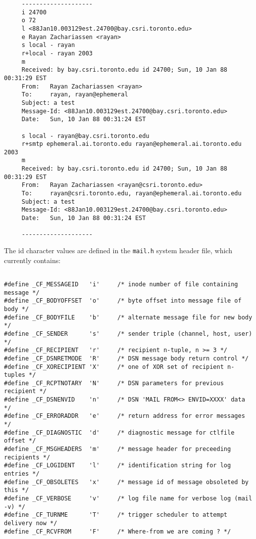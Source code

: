 \begin{tscreen}
\begin{verbatim}
     --------------------
     i 24700
     o 72
     l <88Jan10.003129est.24700@bay.csri.toronto.edu>
     e Rayan Zachariassen <rayan>
     s local - rayan
     r+local - rayan 2003
     m
     Received: by bay.csri.toronto.edu id 24700; Sun, 10 Jan 88 00:31:29 EST
     From:   Rayan Zachariassen <rayan>
     To:     rayan, rayan@ephemeral
     Subject: a test
     Message-Id: <88Jan10.003129est.24700@bay.csri.toronto.edu>
     Date:   Sun, 10 Jan 88 00:31:24 EST
     
     s local - rayan@bay.csri.toronto.edu
     r+smtp ephemeral.ai.toronto.edu rayan@ephemeral.ai.toronto.edu 2003
     m
     Received: by bay.csri.toronto.edu id 24700; Sun, 10 Jan 88 00:31:29 EST
     From:   Rayan Zachariassen <rayan@csri.toronto.edu>
     To:     rayan@csri.toronto.edu, rayan@ephemeral.ai.toronto.edu
     Subject: a test
     Message-Id: <88Jan10.003129est.24700@bay.csri.toronto.edu>
     Date:   Sun, 10 Jan 88 00:31:24 EST
     
     --------------------
\end{verbatim}
\end{tscreen}


The id character values are defined in the {\tt mail.h} system header file,
which currently contains:

\begin{tscreen}
\begin{verbatim}
     
#define _CF_MESSAGEID   'i'     /* inode number of file containing message */
#define _CF_BODYOFFSET  'o'     /* byte offset into message file of body */
#define _CF_BODYFILE    'b'     /* alternate message file for new body */
#define _CF_SENDER      's'     /* sender triple (channel, host, user) */
#define _CF_RECIPIENT   'r'     /* recipient n-tuple, n >= 3 */
#define _CF_DSNRETMODE  'R'     /* DSN message body return control */
#define _CF_XORECIPIENT 'X'     /* one of XOR set of recipient n-tuples */
#define _CF_RCPTNOTARY  'N'     /* DSN parameters for previous recipient */
#define _CF_DSNENVID    'n'     /* DSN 'MAIL FROM<> ENVID=XXXX' data */
#define _CF_ERRORADDR   'e'     /* return address for error messages */
#define _CF_DIAGNOSTIC  'd'     /* diagnostic message for ctlfile offset */
#define _CF_MSGHEADERS  'm'     /* message header for preceeding recipients */
#define _CF_LOGIDENT    'l'     /* identification string for log entries */
#define _CF_OBSOLETES   'x'     /* message id of message obsoleted by this */
#define _CF_VERBOSE     'v'     /* log file name for verbose log (mail -v) */
#define _CF_TURNME      'T'     /* trigger scheduler to attempt delivery now */
#define _CF_RCVFROM     'F'     /* Where-from we are coming ? */               
\end{verbatim}
\end{tscreen}


